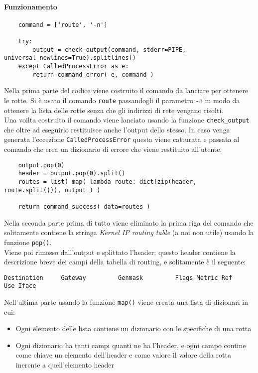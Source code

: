 \documentclass[11pt]{article}
\begin{document}
\paragraph{Funzionamento}
\begin{lstlisting}
    command = ['route', '-n']

    try:
        output = check_output(command, stderr=PIPE, universal_newlines=True).splitlines()
    except CalledProcessError as e:
        return command_error( e, command )
\end{lstlisting}
Nella prima parte del codice viene costruito il comando da lanciare per ottenere le rotte.
Si è usato il comando \texttt{route} passandogli il parametro \texttt{-n} in modo da ottenere
la lista delle rotte senza che gli indirizzi di rete vengano risolti.\\
Una voilta costruito il comando viene lanciato usando la funzione \texttt{check\_output} che
oltre ad eseguirlo restituisce anche l'output dello stesso. In caso venga generata l'eccezione
\texttt{CalledProcessError} questa viene catturata e passata al comando 
che crea un dizionario di errore che viene restituito all'utente.
\begin{lstlisting}
    output.pop(0)
    header = output.pop(0).split()
    routes = list( map( lambda route: dict(zip(header, route.split())), output ) )

    return command_success( data=routes )
\end{lstlisting}
Nella seconda parte prima di tutto viene eliminato la prima riga del comando che solitamente contiene
la stringa \textit{Kernel IP routing table} (a noi non utile) usando la funzione \texttt{pop()}.\\
Viene poi rimosso dall'output e splittato l'header; questo header contiene la descrizione breve
dei campi della tabella di routing, e solitamente è il seguente:
\begin{lstlisting}
Destination     Gateway         Genmask         Flags Metric Ref    Use Iface
\end{lstlisting}
Nell'ultima parte usando la funzione \texttt{map()} viene creata una lista di dizionari
in cui:
\begin{itemize}
	\item{Ogni elemento delle lista contiene un dizionario con le specifiche di una rotta}
	\item{Ogni dizionario ha tanti campi quanti ne ha l'header, e ogni campo contine
		come chiave un elemento dell'header e come valore il valore della rotta inerente
		a quell'elemento header}
\end{itemize}
\end{document}

